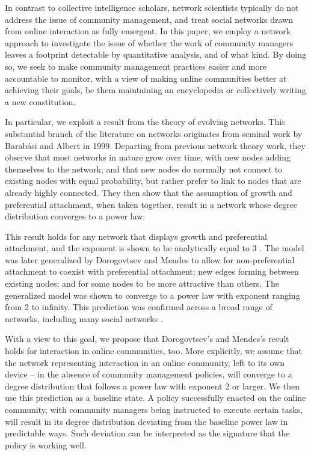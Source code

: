 In contrast to collective intelligence scholars, network scientists typically do not address the issue of community management, and treat social networks drawn from online interaction as fully emergent. In this paper, we employ a network approach to investigate the issue of whether the work of community managers leaves a footprint detectable by quantitative analysis, and of what kind. By doing so, we seek to make community management practices easier and more accountable to monitor, with a view of making online communities better at achieving their goals, be them maintaining an encyclopedia or collectively writing a new constitution. 

In particular, we exploit a result from the theory of evolving networks. This substantial branch of the literature on networks originates from seminal work by Barabási and Albert \cite{barabasi1999emergence} in 1999. Departing from previous network theory work, they observe that most networks in nature grow over time, with new nodes adding themselves to the network; and that new nodes do normally not connect to existing nodes with equal probability, but rather prefer to link to nodes that are already highly connected. They then show that the assumption of growth and preferential attachment, when taken together, result in a network whose degree distribution converges to a power law: 

This result holds for any network that displays growth and preferential attachment, and the exponent is shown to be analytically equal to 3 \cite{barabasi2005origin, barabasi1999mean}.  The model was later generalized by Dorogovtsev and Mendes to allow for non-preferential attachment to coexist with preferential attachment; new edges forming between existing nodes; and for some nodes to be more attractive than others. The generalized model was shown to converge to a power law with exponent ranging from 2 to infinity. This prediction was confirmed across a broad range of networks, including many social networks \cite{dorogovtsev2002evolution}.

With a view to this goal, we propose that Dorogovtsev’s and Mendes’s result \cite{dorogovtsev2002evolution} holds for interaction in online communities, too. More explicitly, we assume that the network representing interaction in an online community, left to its own device – in the absence of community management policies, will converge to a degree distribution that follows a power law with exponent 2 or larger. We then use this prediction as a baseline state. A policy successfully enacted on the online community, with community managers being instructed to execute certain tasks, will result in its degree distribution deviating from the baseline power law in predictable ways. Such deviation can be interpreted as the signature that the policy is working well. 

